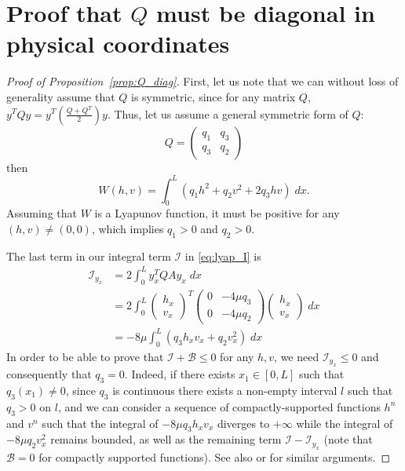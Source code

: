 \documentclass[11pt]{article}
\begin{document}
\appendix

{
\section{Proof that $Q$ must be diagonal in physical coordinates}
\label{app:proof_Q_diag}

\begin{proof}[Proof of Proposition~\ref{prop:Q_diag}]
    First, let us note that we can without loss of generality assume that $Q$ is symmetric, since for any matrix $Q$, $y^T Q y = y^T \left( \frac{Q+Q^T}{2} \right) y$. Thus, let us assume a general symmetric form of $Q$:
    \begin{equation}
        Q = \begin{pmatrix}
            q_1 & q_3 \\ q_3 & q_2
        \end{pmatrix}
    \end{equation}
    then
    \begin{equation}
        {W}(h,v) = \int_0^L (q_1 h^2 + q_2 v^2 + 2q_3hv ) \; dx.
    \end{equation}
    Assuming that ${W}$ is a Lyapunov function, it must be positive for any $(h,v) \neq (0,0)$, which implies $q_1 > 0$ and $q_2 > 0$.
    
    The last term in our integral term $\mathcal{I}$ in \eqref{eq:lyap_I} is 
    \begin{align*}
        \mathcal{I}_{y_x} &= 2\int_0^L y^T_x QA y_x \; dx \\
        &= 2\int_0^L \begin{pmatrix}h_x \\ v_x\end{pmatrix}^T \begin{pmatrix}
            0 & -4\mu q_3 \\ 0 & -4\mu q_2
        \end{pmatrix} \begin{pmatrix}h_x \\ v_x\end{pmatrix} \; dx \\
        &= -8\mu \int_0^L (q_3 h_xv_x + q_2 v_x^2) \; dx
    \end{align*}
    In order to be able to prove that $\mathcal{I} + \mathcal{B} \leq 0$ for any $h,v$, we need $\mathcal{I}_{y_x} \leq 0$ and consequently that $q_{3}=0$. Indeed, if there exists $x_{1}\in [0,L]$  such that $q_{3}(x_{1})\neq0$, since $q_{3}$ is continuous there exists a non-empty interval $l$ such that $q_{3}>0$ on $l$, and we can consider a sequence of compactly-supported functions $h^{n}$ and $v^{n}$ such that the integral of $-8\mu q_{3}h_{x}v_{x}$ diverges to $+\infty$ while the integral of $-8\mu q_{2}v_{x}^{2}$ remains bounded, as well as the remaining term $\mathcal{I}-\mathcal{I}_{y_x}$ (note that $\mathcal{B}=0$ for compactly supported functions).
    {See also \cite[Theorem 3.2]{hayat2018exponentialstabilitygeneral1d} or \cite[Lemma 1]{bastin2011boundary} for similar arguments.}
\end{proof}
}
\end{document}
